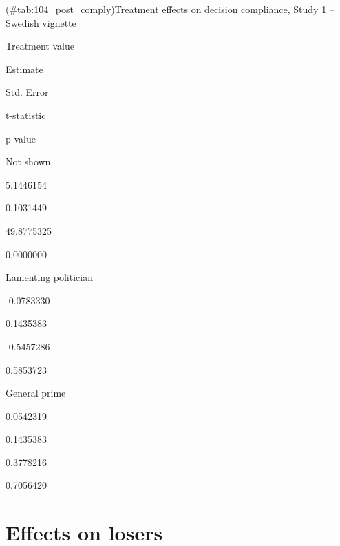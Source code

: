 \documentclass[]{book}
\begin{document}
(\#tab:104\_post\_comply)Treatment effects on decision compliance, Study
1 -- Swedish vignette

Treatment value

Estimate

Std. Error

t-statistic

p value

Not shown

5.1446154

0.1031449

49.8775325

0.0000000

Lamenting politician

-0.0783330

0.1435383

-0.5457286

0.5853723

General prime

0.0542319

0.1435383

0.3778216

0.7056420

\chapter{Effects on losers}\label{effects-on-losers}
\end{document}
